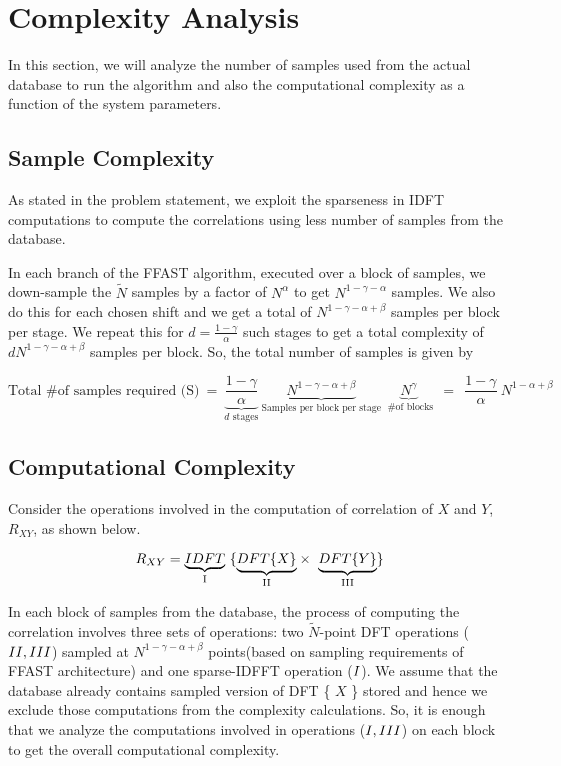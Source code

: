 \section{Complexity Analysis}

In this section, we will analyze the number of samples used from the actual database to run the algorithm and also the computational complexity as a function of the system parameters.

\subsection{Sample Complexity}
As stated in the problem statement, we exploit the sparseness in IDFT computations to compute the correlations using less number of samples from the database.




In each branch of the FFAST algorithm, executed over a block of samples, we down-sample the $\tilde{N}$ samples by a factor of $N^{\alpha}$ to get $N^{1-\gamma-\alpha}$ samples. We also do this for each chosen shift and we get a total of  $N^{1-\gamma-\alpha+\beta}$ samples per block per stage. We repeat this for $d = \frac{1-\gamma}{\alpha}$ such stages to get a total complexity of $dN^{1-\gamma-\alpha+\beta}$ samples per block. So, the total number of samples is given by  

\[
\text{Total \# of samples required (S)} \  = \  \underset{\text{$d$ stages} }{\underbrace{\frac{1-\gamma}{\alpha}}} \ \underset{\text{Samples per block per stage} }{\underbrace{N^{1-\gamma-\alpha+\beta}}} \ \underset{\text{ \# of blocks} }{\underbrace{N^{\gamma}}} \ \ 
   =  \ \ \frac{1-\gamma}{\alpha} \ N^{1-\alpha+\beta}
\]  



\subsection{Computational Complexity}

Consider the operations involved in the computation of correlation of $X$ and $Y$, $R_{XY}$, as shown below.

\[  R_{XY} = \underset{\text{ \RNum{1} } } {\underbrace{IDFT}} \ \{ \underset{\text{ \RNum{2} } }{\underbrace{DFT\{ X \} } }  \times \ \underset{\text{ \RNum{3} } }{\underbrace{DFT\{ Y \} } }  \}  \]


In each block of samples from the database, the process of computing the correlation involves three sets of operations: two $\tilde{N}$-point DFT operations ($\RNum{2}, \RNum{3}$) sampled at $N^{1-\gamma-\alpha+\beta}$ points(based on sampling requirements of FFAST architecture) and one sparse-IDFFT operation ($\RNum{1}$). We assume that the database already contains sampled version of DFT \{ $X$ \} stored and hence we exclude those computations from the complexity calculations. So, it is enough that we analyze the computations involved in operations ($\RNum{1}, \RNum{3}$) on each block to get the overall computational complexity.

